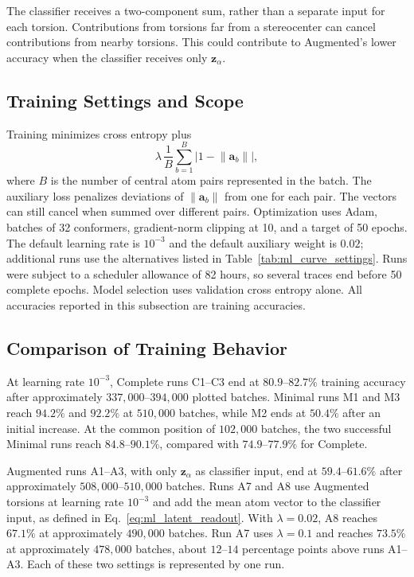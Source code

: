 \documentclass[%
 preprint,
superscriptaddress,
 amsmath,amssymb,
 aip,
 jcp,
]{revtex4-2}
\begin{document}
The classifier receives a two-component sum, rather than a separate input for each torsion.
Contributions from torsions far from a stereocenter can cancel contributions from nearby torsions.
This could contribute to Augmented's lower accuracy when the classifier receives only $\mathbf z_\alpha$.

\subsection{Training Settings and Scope}

Training minimizes cross entropy plus
\begin{equation}
 \lambda\,\frac{1}{B}\sum_{b=1}^{B}
 \left|1-\lVert\mathbf a_b\rVert\right|,
 \label{eq:ml_auxiliary_loss}
\end{equation}
where $B$ is the number of central atom pairs represented in the batch.
The auxiliary loss penalizes deviations of $\lVert\mathbf a_b\rVert$ from one for each pair.
The vectors can still cancel when summed over different pairs.
Optimization uses Adam, batches of 32 conformers, gradient-norm clipping at 10, and a target of 50 epochs.
The default learning rate is $10^{-3}$ and the default auxiliary weight is $0.02$; additional runs use the alternatives listed in Table~\ref{tab:ml_curve_settings}.
Runs were subject to a scheduler allowance of 82 hours, so several traces end before 50 complete epochs.
Model selection uses validation cross entropy alone.
All accuracies reported in this subsection are training accuracies.

\subsection{Comparison of Training Behavior}

At learning rate $10^{-3}$, Complete runs C1--C3 end at $80.9$--$82.7\%$ training accuracy after approximately $337{,}000$--$394{,}000$ plotted batches.
Minimal runs M1 and M3 reach $94.2\%$ and $92.2\%$ at $510{,}000$ batches, while M2 ends at $50.4\%$ after an initial increase.
At the common position of $102{,}000$ batches, the two successful Minimal runs reach $84.8$--$90.1\%$, compared with $74.9$--$77.9\%$ for Complete.

Augmented runs A1--A3, with only $\mathbf z_\alpha$ as classifier input, end at $59.4$--$61.6\%$ after approximately $508{,}000$--$510{,}000$ batches.
Runs A7 and A8 use Augmented torsions at learning rate $10^{-3}$ and add the mean atom vector to the classifier input, as defined in Eq.~\ref{eq:ml_latent_readout}.
With $\lambda=0.02$, A8 reaches $67.1\%$ at approximately $490{,}000$ batches.
Run A7 uses $\lambda=0.1$ and reaches $73.5\%$ at approximately $478{,}000$ batches, about $12$--$14$ percentage points above runs A1--A3.
Each of these two settings is represented by one run.
\end{document}
